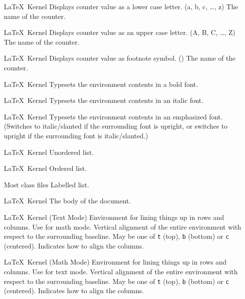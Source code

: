 %
 {}%
 {\LaTeX\ Kernel}%
 {Displays counter value as a lower case letter. (a, b, c, \ldots, z)}%
 {%
    \BeginArgList
      The name of the counter.
    \EndArgList
 }

%
 {}%
 {\LaTeX\ Kernel}%
 {Displays counter value as an upper case letter. (A, B, C, \ldots, Z)}%
 {%
    \BeginArgList
      The name of the counter.
    \EndArgList
 }

%
 {}%
 {\LaTeX\ Kernel}%
 {Displays counter value as footnote symbol. ()}%
 {%
    \BeginArgList
      The name of the counter.
    \EndArgList
 }

%
 {}%
 {\LaTeX\ Kernel}%
 {Typesets the environment contents in a bold font.}%
 {}

%
 {}%
 {\LaTeX\ Kernel}%
 {Typesets the environment contents in an italic font.}%
 {}

%
 {}%
 {\LaTeX\ Kernel}%
 {Typesets the environment contents in an emphasized font. (Switches
  to italic\slash slanted if the surrounding font is upright, or switches to
  upright if the surrounding font is italic\slash slanted.)}%
 {}

%
 {}%
 {\LaTeX\ Kernel}%
 {Unordered list.}%
 {}

%
 {}%
 {\LaTeX\ Kernel}%
 {Ordered list.}%
 {}

%
 {}%
 {Most class files}%
 {Labelled list.}%
 {}

%
 {}%
 {\LaTeX\ Kernel}%
 {The body of the document.}%
 {}

%
 {}%
 {\LaTeX\ Kernel (Text Mode)}%
 {%
   Environment for lining things up in rows and columns.
   Use  for math mode.
 }%
 {%
    \BeginArgList
      Vertical alignment of the entire
      environment with respect to the surrounding baseline. May be
      one of \texttt{t} (top), \texttt{b} (bottom) or \texttt{c}
      (centered).
      Indicates how to align the
     columns.
    \EndArgList
 }

%
 {}%
 {\LaTeX\ Kernel (Math Mode)}%
 {%
   Environment for lining things up in rows and columns.
   Use  for text mode.
 }%
 {%
    \BeginArgList
      Vertical alignment of the entire
      environment with respect to the surrounding baseline. May be
      one of \texttt{t} (top), \texttt{b} (bottom) or \texttt{c}
      (centered).
      Indicates how to align the
     columns.
    \EndArgList
 }

